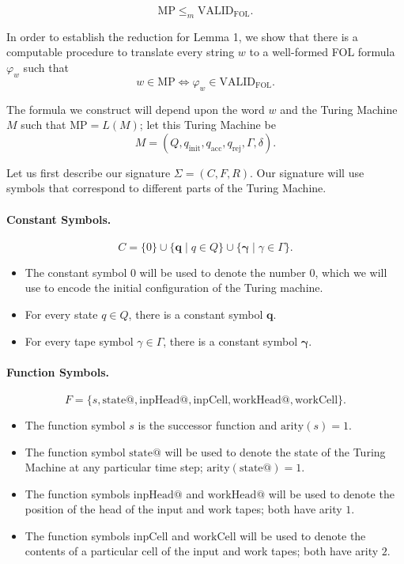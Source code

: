 \documentclass{article}
\newtheorem{lemma}[theorem]{Lemma}
\let\oldlemma\lemma
\let\endoldlemma\endlemma
\renewenvironment{lemma}
  {\begin{tcolorbox}[
      colback=green!8,
      colframe=green!50!black,
      boxrule=0.6pt,
      arc=2pt,
      left=6pt,right=6pt,top=4pt,bottom=4pt
    ]\oldlemma}
  {\endoldlemma\end{tcolorbox}}
\begin{document}
\begin{lemma}
\[
\mathrm{MP} \le_m \mathrm{VALID}_{\mathrm{FOL}}.
\]
\end{lemma}

In order to establish the reduction for Lemma 1, we show that there is a computable procedure to translate every string $w$ to a well-formed FOL formula $\varphi_w$ such that
\[
w \in \mathrm{MP} \iff \varphi_w \in \mathrm{VALID}_{\mathrm{FOL}}.
\]

The formula we construct will depend upon the word $w$ and the Turing Machine $M$ such that $\mathrm{MP}=L(M)$; let this Turing Machine be
\[
M=(Q,q_{\mathrm{init}},q_{\mathrm{acc}},q_{\mathrm{rej}},\Gamma,\delta).
\]

Let us first describe our signature $\Sigma=(C,F,R)$. Our signature will use symbols that correspond to different parts of the Turing Machine.

\paragraph{Constant Symbols.}
\[
C = \{0\} \cup \{\mathbf{q} \mid q \in Q\} \cup \{\boldsymbol{\gamma} \mid \gamma \in \Gamma\}.
\]
\begin{itemize}
    \item The constant symbol $0$ will be used to denote the number $0$, which we will use to encode the initial configuration of the Turing machine.
    \item For every state $q \in Q$, there is a constant symbol $\mathbf{q}$.
    \item For every tape symbol $\gamma \in \Gamma$, there is a constant symbol $\boldsymbol{\gamma}$.
\end{itemize}

\paragraph{Function Symbols.}
\[
F=\{s,\mathrm{state@},\mathrm{inpHead@},\mathrm{inpCell},\mathrm{workHead@},\mathrm{workCell}\}.
\]
\begin{itemize}
    \item The function symbol $s$ is the successor function and $\mathrm{arity}(s)=1$.
    \item The function symbol $\mathrm{state@}$ will be used to denote the state of the Turing Machine at any particular time step; $\mathrm{arity}(\mathrm{state@})=1$.
    \item The function symbols $\mathrm{inpHead@}$ and $\mathrm{workHead@}$ will be used to denote the position of the head of the input and work tapes; both have arity $1$.
    \item The function symbols $\mathrm{inpCell}$ and $\mathrm{workCell}$ will be used to denote the contents of a particular cell of the input and work tapes; both have arity $2$.
\end{itemize}
\end{document}
